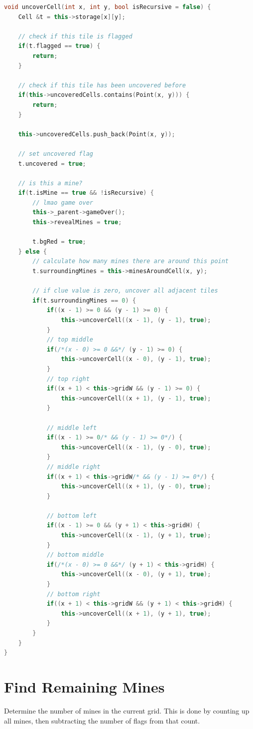 \documentclass[11pt]{article}
\begin{document}
\begin{lstlisting}[frame=single,language=C++]
void uncoverCell(int x, int y, bool isRecursive = false) {
	Cell &t = this->storage[x][y];

	// check if this tile is flagged
	if(t.flagged == true) {
		return;
	}

	// check if this tile has been uncovered before
	if(this->uncoveredCells.contains(Point(x, y))) {
		return;
	}

	this->uncoveredCells.push_back(Point(x, y));

	// set uncovered flag
	t.uncovered = true;

	// is this a mine?
	if(t.isMine == true && !isRecursive) {
		// lmao game over
		this->_parent->gameOver();
		this->revealMines = true;

		t.bgRed = true;
	} else {
		// calculate how many mines there are around this point
		t.surroundingMines = this->minesAroundCell(x, y);

		// if clue value is zero, uncover all adjacent tiles
		if(t.surroundingMines == 0) {
			if((x - 1) >= 0 && (y - 1) >= 0) {
				this->uncoverCell((x - 1), (y - 1), true);
			}
			// top middle
			if(/*(x - 0) >= 0 &&*/ (y - 1) >= 0) {
				this->uncoverCell((x - 0), (y - 1), true);
			}
			// top right
			if((x + 1) < this->gridW && (y - 1) >= 0) {
				this->uncoverCell((x + 1), (y - 1), true);
			}

			// middle left
			if((x - 1) >= 0/* && (y - 1) >= 0*/) {
				this->uncoverCell((x - 1), (y - 0), true);
			}
			// middle right
			if((x + 1) < this->gridW/* && (y - 1) >= 0*/) {
				this->uncoverCell((x + 1), (y - 0), true);
			}

			// bottom left
			if((x - 1) >= 0 && (y + 1) < this->gridH) {
				this->uncoverCell((x - 1), (y + 1), true);
			}
			// bottom middle
			if(/*(x - 0) >= 0 &&*/ (y + 1) < this->gridH) {
				this->uncoverCell((x - 0), (y + 1), true);
			}
			// bottom right
			if((x + 1) < this->gridW && (y + 1) < this->gridH) {
				this->uncoverCell((x + 1), (y + 1), true);
			}
		}
	}
}
\end{lstlisting}


\section{Find Remaining Mines}
Determine the number of mines in the current grid. This is done by counting up all mines, then subtracting the number of flags from that count.
\end{document}

